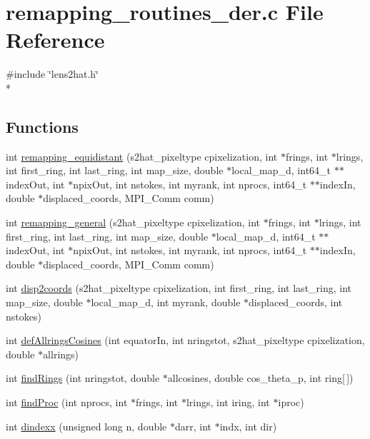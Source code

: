 \section{remapping\-\_\-routines\-\_\-der.\-c File Reference}
\label{derivatives__nersc_2remapping__routines__der_8c}
{\ttfamily \#include \char`\"{}lens2hat.\-h\char`\"{}}\\*
\subsection*{Functions}
\begin{DoxyCompactItemize}
\item 
int \hyperlink{derivatives__nersc_2remapping__routines__der_8c_a62593f0a95155700c13a0f25b7ca0f07}{remapping\-\_\-equidistant} (s2hat\-\_\-pixeltype cpixelization, int $\ast$frings, int $\ast$lrings, int first\-\_\-ring, int last\-\_\-ring, int map\-\_\-size, double $\ast$local\-\_\-map\-\_\-d, int64\-\_\-t $\ast$$\ast$index\-Out, int $\ast$npix\-Out, int nstokes, int myrank, int nprocs, int64\-\_\-t $\ast$$\ast$index\-In, double $\ast$displaced\-\_\-coords, M\-P\-I\-\_\-\-Comm comm)
\item 
int \hyperlink{derivatives__nersc_2remapping__routines__der_8c_a1d7d063047d20b437aaa39cddf5f0f65}{remapping\-\_\-general} (s2hat\-\_\-pixeltype cpixelization, int $\ast$frings, int $\ast$lrings, int first\-\_\-ring, int last\-\_\-ring, int map\-\_\-size, double $\ast$local\-\_\-map\-\_\-d, int64\-\_\-t $\ast$$\ast$index\-Out, int $\ast$npix\-Out, int nstokes, int myrank, int nprocs, int64\-\_\-t $\ast$$\ast$index\-In, double $\ast$displaced\-\_\-coords, M\-P\-I\-\_\-\-Comm comm)
\item 
int \hyperlink{derivatives__nersc_2remapping__routines__der_8c_a8224d455c626532938c1729f5e62daee}{disp2coords} (s2hat\-\_\-pixeltype cpixelization, int first\-\_\-ring, int last\-\_\-ring, int map\-\_\-size, double $\ast$local\-\_\-map\-\_\-d, int myrank, double $\ast$displaced\-\_\-coords, int nstokes)
\item 
int \hyperlink{derivatives__nersc_2remapping__routines__der_8c_af6cfda4741a11339b5a1d9c599411b87}{def\-Allrings\-Cosines} (int equator\-In, int nringstot, s2hat\-\_\-pixeltype cpixelization, double $\ast$allrings)
\item 
int \hyperlink{derivatives__nersc_2remapping__routines__der_8c_a95c082e86d6e644f4789485021f90235}{find\-Rings} (int nringstot, double $\ast$allcosines, double cos\-\_\-theta\-\_\-p, int ring\mbox{[}$\,$\mbox{]})
\item 
int \hyperlink{derivatives__nersc_2remapping__routines__der_8c_af4ba917a5b9f32394911c8d28d6c2d07}{find\-Proc} (int nprocs, int $\ast$frings, int $\ast$lrings, int iring, int $\ast$iproc)
\item 
int \hyperlink{derivatives__nersc_2remapping__routines__der_8c_ad574f0dfca1f8db2b630a9b6cf3a45c9}{dindexx} (unsigned long n, double $\ast$darr, int $\ast$indx, int dir)
\end{DoxyCompactItemize}


